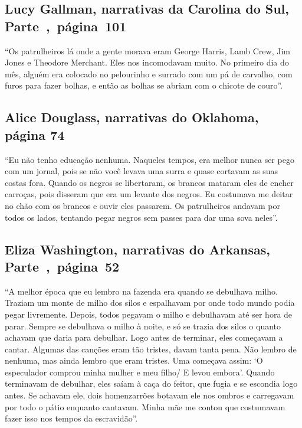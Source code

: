 \subsection{Lucy Gallman, narrativas da Carolina do Sul, Parte~,~página~101}
\label{ref98}

``Os patrulheiros lá onde a gente morava eram George Harris, Lamb Crew,
Jim Jones e Theodore Merchant. Eles nos incomodavam muito. No primeiro
dia do mês, alguém era colocado no pelourinho e surrado com um pá de %
carvalho, com furos para fazer bolhas, e então as bolhas se abriam com o
chicote de couro''.

\subsection{Alice Douglass, narrativas do Oklahoma, página 74} \label{ref73}

``Eu não tenho educação nenhuma. Naqueles tempos, era melhor nunca ser
pego com um jornal, pois se não você levava uma surra e quase cortavam
as suas costas fora. Quando os negros se libertaram, os brancos mataram
eles de encher carroças, pois disseram que era um levante dos negros. Eu
costumava me deitar no chão com os brancos e ouvir eles passarem. Os
patrulheiros andavam por todos os lados, tentando pegar negros sem
passes para dar uma sova neles''.

\subsection{Eliza Washington, narrativas do Arkansas, Parte~,~página~52}
\label{ref278}

``A melhor época que eu lembro na fazenda era quando se debulhava milho.
Traziam um monte de milho dos silos e espalhavam por onde todo mundo
podia pegar livremente. Depois, todos pegavam o milho e debulhavam até
ser hora de parar. Sempre se debulhava o milho à noite, e só se trazia
dos silos o quanto achavam que daria para debulhar. Logo antes de
terminar, eles começavam a cantar. Algumas das canções eram tão tristes,
davam tanta pena. Não lembro de nenhuma, mas ainda lembro que eram
tristes. Uma começava assim: `O especulador comprou minha mulher e meu
filho/ E levou embora'. Quando terminavam de debulhar, eles saíam à
caça do feitor, que fugia e se escondia logo antes. Se achavam ele, dois
homenzarrões botavam ele nos ombros e carregavam por todo o pátio
enquanto cantavam. Minha mãe me contou que costumavam fazer isso nos
tempos da escravidão''.

